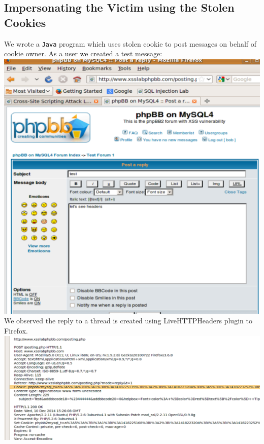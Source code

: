 \documentclass[12pt, a4paper]{article}
\begin{document}
\subsection{Impersonating the Victim using the Stolen Cookies}
We wrote a \texttt{Java} program which uses stolen cookie to post messages on behalf of cookie owner. As a user we created a test message:\\

\includegraphics[width=.95\textwidth]{gfx/xss/task4-see-headers.png}\\[1cm]

We observed the reply to a thread is created using LiveHTTPHeaders plugin to Firefox.\\

\includegraphics[width=.95\textwidth]{gfx/xss/task4-inspecting-headers.png}\\[1cm]
\end{document}
